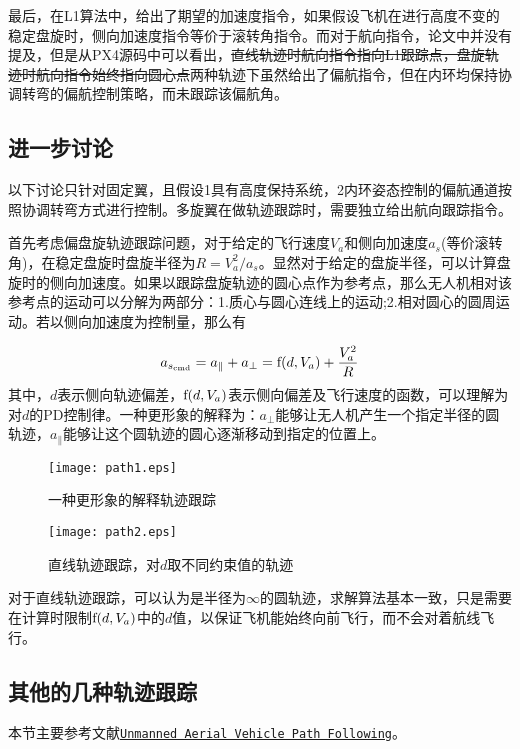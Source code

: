 最后，在L1算法中，给出了期望的加速度指令，如果假设飞机在进行高度不变的稳定盘旋时，侧向加速度指令等价于滚转角指令。而对于航向指令，论文中并没有提及，但是从PX4源码中可以看出，{\sout{直线轨迹时航向指令指向L1跟踪点，盘旋轨迹时航向指令始终指向圆心点}}两种轨迹下虽然给出了偏航指令，但在内环均保持协调转弯的偏航控制策略，而未跟踪该偏航角。
　
\subsection{进一步讨论}
以下讨论只针对固定翼，且假设1具有高度保持系统，2内环姿态控制的偏航通道按照协调转弯方式进行控制。多旋翼在做轨迹跟踪时，需要独立给出航向跟踪指令。

首先考虑偏盘旋轨迹跟踪问题，对于给定的飞行速度$V_a$和侧向加速度$a_s$(等价滚转角)，在稳定盘旋时盘旋半径为$R = V_a^2 / a_s$。显然对于给定的盘旋半径，可以计算盘旋时的侧向加速度。如果以跟踪盘旋轨迹的圆心点作为参考点，那么无人机相对该参考点的运动可以分解为两部分：1.质心与圆心连线上的运动;2.相对圆心的圆周运动。若以侧向加速度为控制量，那么有

\begin{equation}
    a_{s_\rm{cmd}} = a_{\parallel} + a_{\perp} = \rm{f}(d,V_a) + \frac{V_a^2}{R}
\end{equation}
其中，$d$表示侧向轨迹偏差，$\rm{f}(d,V_a)$表示侧向偏差及飞行速度的函数，可以理解为对$d$的PD控制律。一种更形象的解释为：$a_{\perp}$能够让无人机产生一个指定半径的圆轨迹，$a_{\parallel}$能够让这个圆轨迹的圆心逐渐移动到指定的位置上。

\begin{figure}[htbp]
	\begin{minipage}[t]{0.5\textwidth}
	\centering
	\texttt{[image: path1.eps]}
	\caption{\label{fig: path1} 一种更形象的解释轨迹跟踪}
	\end{minipage}
	\begin{minipage}[t]{0.5\textwidth}
	\centering
	\texttt{[image: path2.eps]}
	\caption{\label{fig: path2} 直线轨迹跟踪，对$d$取不同约束值的轨迹}
	\end{minipage}
\end{figure}


对于直线轨迹跟踪，可以认为是半径为$\infty$的圆轨迹，求解算法基本一致，只是需要在计算时限制$\rm{f}(d,V_a)$中的$d$值，以保证飞机能始终向前飞行，而不会对着航线飞行。

\subsection{其他的几种轨迹跟踪}
本节主要参考文献\href{attachment/Unmanned Aerial Vehicle Path Following.pdf}{\texttt{Unmanned Aerial Vehicle Path Following}}。


